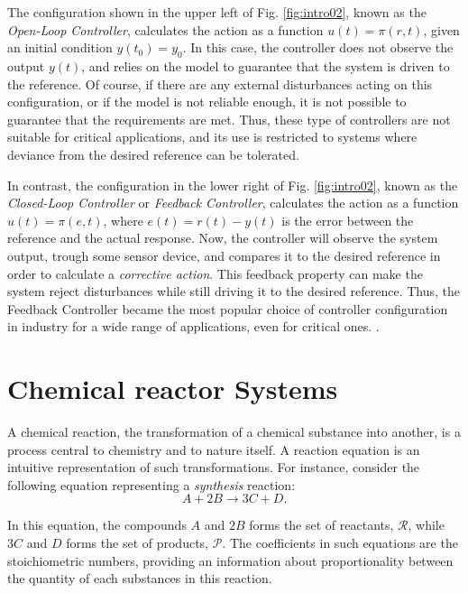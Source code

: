 \documentclass[a4paper,11pt]{book}
\numberwithin{figure}{chapter}
\numberwithin{equation}{chapter}
\numberwithin{table}{chapter}
\theoremstyle{definition}
\begin{document}
The configuration shown in the upper left of Fig. \ref{fig:intro02}, known as the \textit{Open-Loop Controller}, calculates the action as a function $u(t) = \pi(r, t)$, given an initial condition $y(t_0) = y_0$. In this case, the controller does not observe the output $y(t)$, and relies on the model to guarantee that the system is driven to the reference. Of course, if there are any external disturbances acting on this configuration, or if the model is not reliable enough, it is not possible to guarantee that the requirements are met. Thus, these type of controllers are not suitable for critical applications, and its use is restricted to systems where deviance from the desired reference can be tolerated. 

In contrast, the configuration in the lower right of Fig. \ref{fig:intro02}, known as the \textit{Closed-Loop Controller} or \textit{Feedback Controller}, calculates the action as a function $u(t) = \pi(e, t)$, where $e(t) = r(t) - y(t)$ is the error between the reference and the actual response. Now, the controller will observe the system output, trough some sensor device, and compares it to the desired reference in order to calculate a \textit{corrective action}. This feedback property can make the system reject disturbances while still driving it to the desired reference. Thus, the Feedback Controller became the most popular choice of controller configuration in industry for a wide range of applications, even for critical ones.  \cite{Syrmos:1997}.

\section{Chemical reactor Systems}

A chemical reaction, the transformation of a chemical substance into another, is a process central to chemistry and to nature itself. A reaction equation is an intuitive representation of such transformations. For instance, consider the following equation representing a \textit{synthesis} reaction:
\begin{equation}
    A + 2 B \longrightarrow 3 C + D 
.\end{equation} 

\noindent In this equation, the compounds $A$ and $2 B$ forms the set of reactants, $\mathcal{R}$, while $3 C$ and $D$ forms the set of products, $\mathcal{P}$. The coefficients in such equations are the stoichiometric numbers, providing an information about proportionality between the quantity of each substances in this reaction. 
\end{document}
